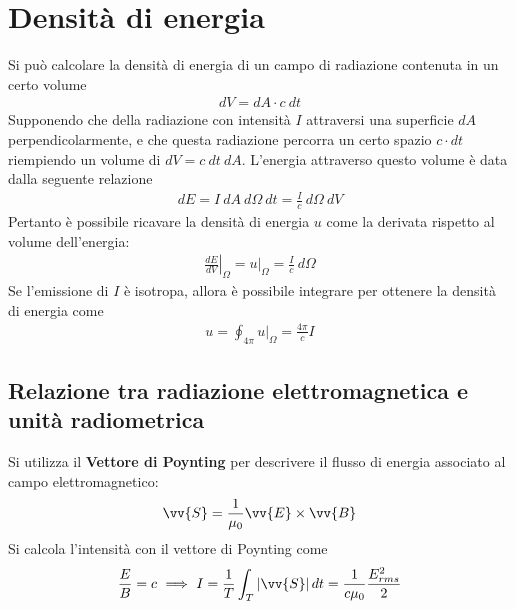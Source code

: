 \documentclass[a4paper, oneside]{book}
\begin{document}
\section{Densità di energia}
\begin{figure}
    \centering
\end{figure}
Si può calcolare la densità di energia di un campo di radiazione contenuta in un certo volume 
\begin{gather*}
    dV = dA \cdot c \ dt
\end{gather*}
Supponendo che della radiazione con intensità $I$ attraversi una superficie 
$dA$ perpendicolarmente, e che questa radiazione percorra un certo spazio $c \cdot dt$
riempiendo un volume di $dV = c \ dt \ dA$. L'energia attraverso questo volume è 
data dalla seguente relazione
\begin{gather*}
    dE = I \ dA \ d\Omega \ dt = \frac{I}{c}\ d\Omega \ dV
\end{gather*}
Pertanto è possibile ricavare la densità di energia $u$ come la derivata rispetto 
al volume dell'energia:
\begin{gather*}
    \left.\frac{dE}{dV}\right|_{\Omega} = \left. u \right|_{\Omega} = \frac{I}{c} \ d\Omega 
\end{gather*}
Se l'emissione di $I$ è isotropa, allora è possibile integrare per ottenere la densità di energia come
\begin{align}
    u = \oint_{4\pi} \left. u \right|_{\Omega} = \frac{4\pi}{c}I 
\end{align}

\subsection{Relazione tra radiazione elettromagnetica e unità radiometrica}
Si utilizza il \textbf{Vettore di Poynting} per descrivere il flusso di energia associato al campo elettromagnetico:
\begin{align}
    \vv{S} = \frac{1}{\mu_0}\vv{E} \times \vv{B}   
\end{align}
Si calcola l'intensità con il vettore di Poynting come
\begin{gather*}
    \frac{E}{B} = c \ \Longrightarrow \ I = \frac{1}{T}\int_{T} \left| \vv{S}  \right| dt = \frac{1}{c\mu_0} \frac{E_{rms}^{2}}{2} 
\end{gather*}
\end{document}
